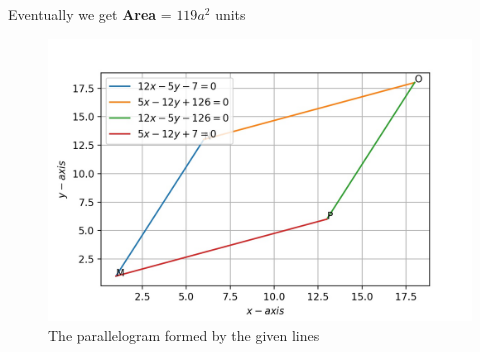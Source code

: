 \documentclass[journal,12pt,twocolumn]{IEEEtran}
\begin{document}
Eventually we get \textbf{Area} = $119a^2$ units
\begin{figure}[!ht]
	\centering
	\includegraphics[width=\columnwidth]{parallelogram.jpg}
	\caption{The parallelogram formed by the given lines}
	\label{fig:parallelogram}
\end{figure}
\end{document}

